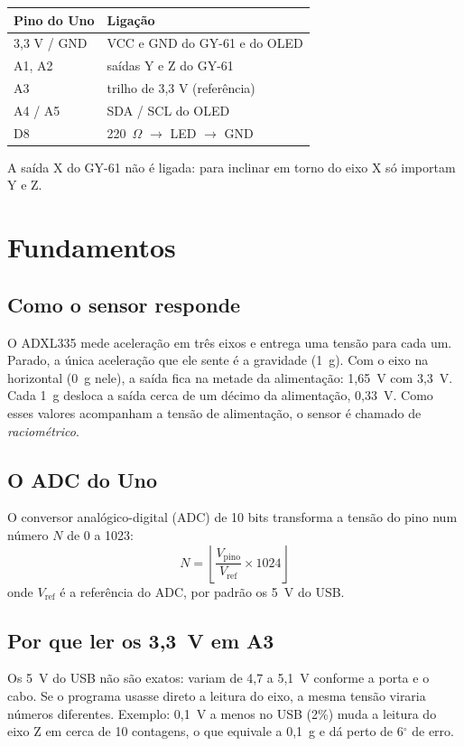 \documentclass[11pt,a4paper]{article}
\begin{document}
\begin{center}
\begin{tabular}{ll}
\toprule
Pino do Uno & Ligação \\
\midrule
3,3 V / GND & VCC e GND do GY-61 e do OLED \\
A1, A2 & saídas Y e Z do GY-61 \\
A3 & trilho de 3,3 V (referência) \\
A4 / A5 & SDA / SCL do OLED \\
D8 & 220~$\Omega$ $\rightarrow$ LED $\rightarrow$ GND \\
\bottomrule
\end{tabular}
\end{center}

A saída X do GY-61 não é ligada: para inclinar em torno do eixo X só
importam Y e Z.

\section{Fundamentos}

\subsection{Como o sensor responde}
O ADXL335 mede aceleração em três eixos e entrega uma tensão para cada
um. Parado, a única aceleração que ele sente é a gravidade (1~g). Com
o eixo na horizontal (0~g nele), a saída fica na metade da alimentação:
1,65~V com 3,3~V. Cada 1~g desloca a saída cerca de um décimo da
alimentação, 0,33~V. Como esses valores acompanham a tensão de
alimentação, o sensor é chamado de \emph{raciométrico}.

\subsection{O ADC do Uno}
O conversor analógico-digital (ADC) de 10 bits transforma a tensão do
pino num número $N$ de 0 a 1023:
\[
  N = \left\lfloor \frac{V_\text{pino}}{V_\text{ref}} \times 1024 \right\rfloor
\]
onde $V_\text{ref}$ é a referência do ADC, por padrão os 5~V do USB.

\subsection{Por que ler os 3,3~V em A3}\label{sec:ref}
Os 5~V do USB não são exatos: variam de 4,7 a 5,1~V conforme a porta e
o cabo. Se o programa usasse direto a leitura do eixo, a mesma tensão
viraria números diferentes. Exemplo: 0,1~V a menos no USB (2\%) muda a
leitura do eixo Z em cerca de 10 contagens, o que equivale a 0,1~g e
dá perto de 6$^\circ$ de erro.
\end{document}
